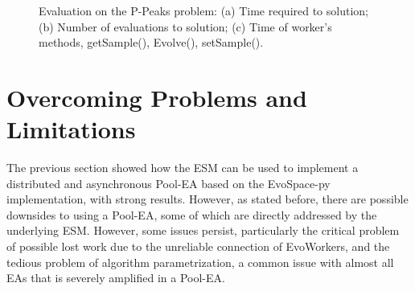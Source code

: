 \begin{figure}[t]
    \centering
    \caption{Evaluation on the P-Peaks problem:
    (a) Time required to solution;
    (b) Number of evaluations to solution; (c) Time of worker's methods, getSample(), Evolve(), setSample().}
    \label{fig:effort_real_time}
\end{figure}




\section{Overcoming Problems and Limitations}
\label{sec:overcome}
The previous section showed how the ESM can be used to implement a distributed and asynchronous Pool-EA based on the EvoSpace-py implementation,
with strong results.
However, as stated before, there are possible downsides to using a Pool-EA, some of which are directly addressed by the underlying ESM.
However, some issues persist, particularly the critical problem of possible lost work due to the unreliable connection of EvoWorkers,
and the tedious problem of algorithm parametrization, a common issue with almost all EAs that is severely amplified in a Pool-EA.

